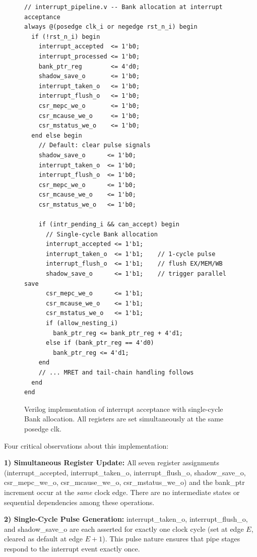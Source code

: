 \documentclass[letterpaper,journal]{IEEEtran}
\begin{document}
\begin{figure}[!t]
\centering
\begin{verbatim}
// interrupt_pipeline.v -- Bank allocation at interrupt acceptance
always @(posedge clk_i or negedge rst_n_i) begin
  if (!rst_n_i) begin
    interrupt_accepted  <= 1'b0;
    interrupt_processed <= 1'b0;
    bank_ptr_reg        <= 4'd0;
    shadow_save_o       <= 1'b0;
    interrupt_taken_o   <= 1'b0;
    interrupt_flush_o   <= 1'b0;
    csr_mepc_we_o       <= 1'b0;
    csr_mcause_we_o     <= 1'b0;
    csr_mstatus_we_o    <= 1'b0;
  end else begin
    // Default: clear pulse signals
    shadow_save_o      <= 1'b0;
    interrupt_taken_o  <= 1'b0;
    interrupt_flush_o  <= 1'b0;
    csr_mepc_we_o      <= 1'b0;
    csr_mcause_we_o    <= 1'b0;
    csr_mstatus_we_o   <= 1'b0;

    if (intr_pending_i && can_accept) begin
      // Single-cycle Bank allocation
      interrupt_accepted <= 1'b1;
      interrupt_taken_o  <= 1'b1;    // 1-cycle pulse
      interrupt_flush_o  <= 1'b1;    // flush EX/MEM/WB
      shadow_save_o      <= 1'b1;    // trigger parallel save
      csr_mepc_we_o      <= 1'b1;
      csr_mcause_we_o    <= 1'b1;
      csr_mstatus_we_o   <= 1'b1;
      if (allow_nesting_i)
        bank_ptr_reg <= bank_ptr_reg + 4'd1;
      else if (bank_ptr_reg == 4'd0)
        bank_ptr_reg <= 4'd1;
    end
    // ... MRET and tail-chain handling follows
  end
end
\end{verbatim}
\caption{Verilog implementation of interrupt acceptance with single-cycle Bank allocation. All registers are set simultaneously at the same posedge clk.}
\label{fig:rtl_accept}
\end{figure}

Four critical observations about this implementation:

\textbf{1) Simultaneous Register Update:} All seven register assignments (interrupt\_accepted, interrupt\_taken\_o, interrupt\_flush\_o, shadow\_save\_o, csr\_mepc\_we\_o, csr\_mcause\_we\_o, csr\_mstatus\_we\_o) and the bank\_ptr increment occur at the \emph{same} clock edge. There are no intermediate states or sequential dependencies among these operations.

\textbf{2) Single-Cycle Pulse Generation:} interrupt\_taken\_o, interrupt\_flush\_o, and shadow\_save\_o are each asserted for exactly one clock cycle (set at edge $E$, cleared as default at edge $E+1$). This pulse nature ensures that pipe stages respond to the interrupt event exactly once.
\end{document}
